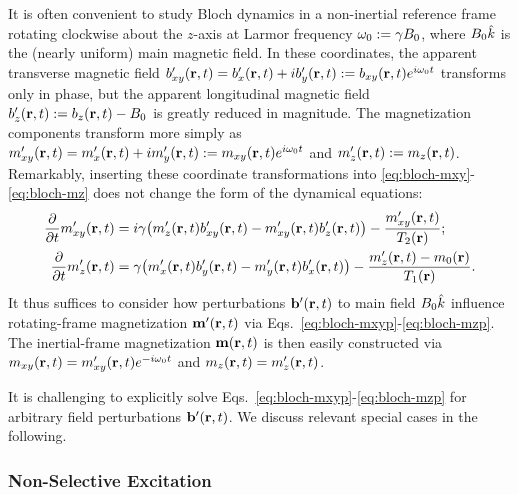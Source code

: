 It is often convenient 
to study Bloch dynamics in a non-inertial reference frame
rotating clockwise about the $z$-axis 
at Larmor frequency 
$\omega_0 := \gamma B_0$,
where 
$B_0 \hat{k}$
is the (nearly uniform) main magnetic field.
In these coordinates,
the apparent transverse magnetic field 
$\bxyp\prt = \bxp\prt + i\byp\prt := \bxy\prt e^{i\omzero t}$
transforms only in phase,
but the apparent longitudinal magnetic field
$\bzp\prt := \bz\prt - \Bzero$
is greatly reduced in magnitude.
The magnetization components transform more simply as
$\mxyp\prt = \mxp\prt + i\myp\prt := \mxy\prt e^{i\omzero t}$
and 
$\mzp\prt := \mz\prt$.
Remarkably, inserting these coordinate transformations 
into \eqref{eq:bloch-mxy}-\eqref{eq:bloch-mz} 
does not change the form
of the dynamical equations:
\begin{align}
	\dela{t} \mxyp\prt &= i\gam\paren{\mzp\prt \bxyp\prt - \mxyp\prt \bzp\prt} -
		\frac{\mxyp\prt}{\Tt\pr} ;
		\label{eq:bloch-mxyp} \\
	\dela{t} \mzp\prt &= \gam\paren{\mxp\prt \byp\prt - \myp\prt \bxp\prt} - 
		\frac{\mzp\prt - \mzero\pr}{\To\pr}.
		\label{eq:bloch-mzp}
\end{align}
It thus suffices to consider 
how perturbations $\bmbp\prt$
to main field $B_0 \hat{k}$ 
influence rotating-frame magnetization $\bmmp\prt$
via Eqs.~\eqref{eq:bloch-mxyp}-\eqref{eq:bloch-mzp}.
The inertial-frame magnetization $\bmm\prt$ 
is then easily constructed via
$\mxy\prt = \mxyp\prt e^{-i\omzero t}$ 
and $\mz\prt = \mzp\prt$.

It is challenging
to explicitly solve Eqs.~\eqref{eq:bloch-mxyp}-\eqref{eq:bloch-mzp}
for arbitrary field perturbations $\bmbp\prt$. 
We discuss relevant special cases 
in the following.

\subsubsection{Non-Selective Excitation}
\label{sss,bkgrd,mri,bloch,ex}

